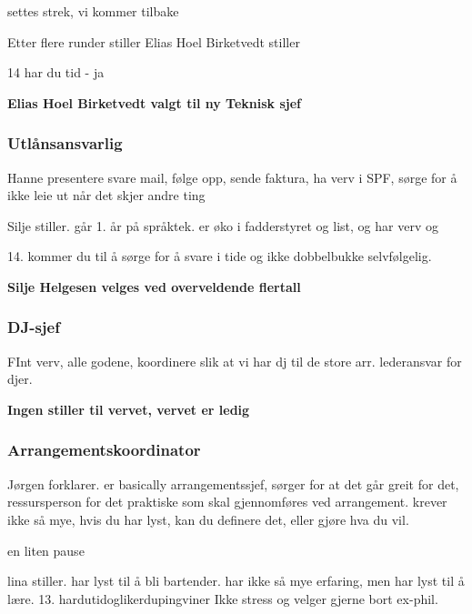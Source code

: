 \documentclass[10pt,norsk,a4paper,usenames,dvipsnames]{article}
\begin{document}
        settes strek, vi kommer tilbake
        
        Etter flere runder stiller Elias Hoel Birketvedt stiller
        
        14 har du tid
        - ja
        
        \textbf{Elias Hoel Birketvedt valgt til ny Teknisk sjef}
        
        \subsubsection{Utlånsansvarlig}
        Hanne presentere
        svare mail, følge opp, sende faktura, ha verv i SPF, sørge for å ikke leie ut når det skjer andre ting
        
        Silje stiller. går 1. år på språktek. er øko i fadderstyret og list, og har verv og
        
        14. kommer du til å sørge for å svare i tide og ikke dobbelbukke
        selvfølgelig.
        
        \textbf{Silje Helgesen velges ved overveldende flertall}
        
        \subsubsection{DJ-sjef}
        FInt verv, alle godene, koordinere slik at vi har dj til de store arr. lederansvar for djer. 
        
        \textbf{Ingen stiller til vervet, vervet er ledig}
        
        
        
        \subsubsection{Arrangementskoordinator}

        Jørgen forklarer. er basically arrangementssjef, sørger for at det går greit for det, ressursperson for det praktiske som skal gjennomføres ved arrangement. krever ikke så mye, hvis du har lyst, kan du definere det, eller gjøre hva du vil.
        
        en liten pause
        
        lina stiller. har lyst til å bli bartender. har ikke så mye erfaring, men har lyst til å lære.
        13. hardutidoglikerdupingviner
        Ikke stress og velger gjerne bort ex-phil.
        
\end{document}
